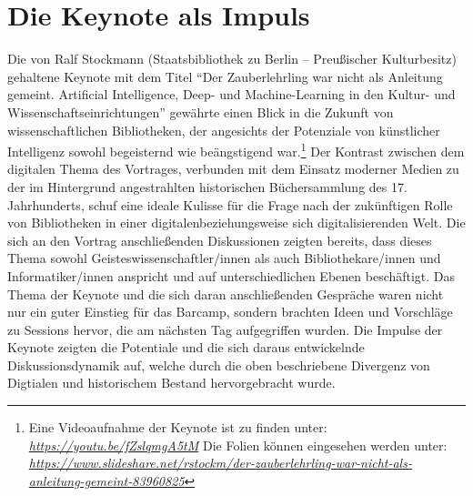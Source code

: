 \documentclass[a4paper,
fontsize=11pt,
oneside,
numbers=noperiodatend,
parskip=half-,
bibliography=totoc,
final
]{scrartcl}
\begin{document}
\section{Die Keynote als Impuls}\label{die-keynote-als-impuls}

Die von Ralf Stockmann (Staatsbibliothek zu Berlin -- Preußischer
Kulturbesitz) gehaltene Keynote mit dem Titel \enquote{Der
Zauberlehrling war nicht als Anleitung gemeint. Artificial Intelligence,
Deep- und Machine-Learning in den Kultur- und
Wissenschaftseinrichtungen} gewährte einen Blick in die Zukunft von
wissenschaftlichen Bibliotheken, der angesichts der Potenziale von
künstlicher Intelligenz sowohl begeisternd wie beängstigend
war.\footnote{Eine Videoaufnahme der Keynote ist zu finden unter:
  \href{https://youtu.be/fZslqmgA5tM}{\emph{https://youtu.be/fZslqmgA5tM}}
  Die Folien können eingesehen werden unter:
  \href{https://www.slideshare.net/rstockm/der-zauberlehrling-war-nicht-als-anleitung-gemeint-83960825}{\emph{https://www.slideshare.net/rstockm/der-zauberlehrling-war-nicht-als-anleitung-gemeint-83960825}}}
Der Kontrast zwischen dem digitalen Thema des Vortrages, verbunden mit
dem Einsatz moderner Medien zu der im Hintergrund angestrahlten
historischen Büchersammlung des 17. Jahrhunderts, schuf eine ideale
Kulisse für die Frage nach der zukünftigen Rolle von Bibliotheken in
einer digitalenbeziehungsweise sich digitalisierenden Welt. Die sich an
den Vortrag anschließenden Diskussionen zeigten bereits, dass dieses
Thema sowohl Geisteswissenschaftler/innen als auch Bibliothekare/innen
und Informatiker/innen anspricht und auf unterschiedlichen Ebenen
beschäftigt. Das Thema der Keynote und die sich daran anschließenden
Gespräche waren nicht nur ein guter Einstieg für das Barcamp, sondern
brachten Ideen und Vorschläge zu Sessions hervor, die am nächsten Tag
aufgegriffen wurden. Die Impulse der Keynote zeigten die Potentiale und
die sich daraus entwickelnde Diskussionsdynamik auf, welche durch die
oben beschriebene Divergenz von Digtialen und historischem Bestand
hervorgebracht wurde.
\end{document}

